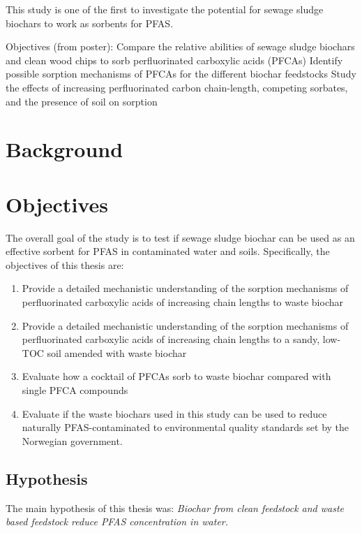 This study is one of the first to investigate the potential for sewage sludge biochars to work as sorbents for PFAS.

Objectives (from poster):
Compare the relative abilities of sewage sludge biochars and clean wood chips to sorb perfluorinated carboxylic acids (PFCAs)
Identify possible sorption mechanisms of PFCAs for the different biochar feedstocks
Study the effects of increasing perfluorinated carbon chain-length, competing sorbates, and the presence of soil on sorption

\section{Background}\label{sec:Background}
 

\section{Objectives}
The overall goal of the study is to test if sewage sludge biochar can be used as an effective sorbent for PFAS in contaminated water and soils. Specifically, the objectives of this thesis are:
\begin{enumerate}
    \item {Provide a detailed mechanistic understanding of the sorption mechanisms of perfluorinated carboxylic acids of increasing chain lengths to waste biochar}
    \item{Provide a detailed mechanistic understanding of the sorption mechanisms of perfluorinated carboxylic acids of increasing chain lengths to a sandy, low-TOC soil amended with waste biochar}
    \item{Evaluate how a cocktail of PFCAs sorb to waste biochar compared with single PFCA compounds}
    \item{Evaluate if the waste biochars used in this study can be used to reduce naturally PFAS-contaminated to environmental quality standards set by the Norwegian government.}
\end{enumerate}

\subsection{Hypothesis}
The main hypothesis of this thesis was:
\textit{Biochar from clean feedstock and waste based feedstock reduce PFAS concentration in water.}

